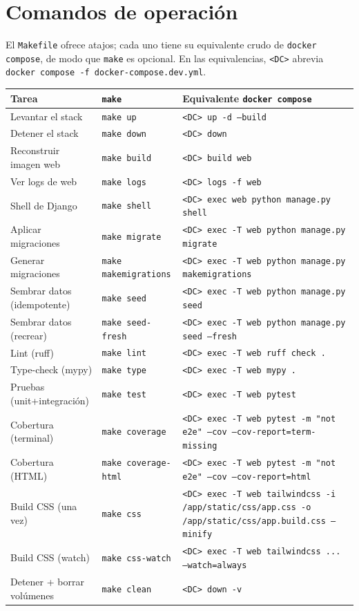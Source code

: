 \documentclass[12pt,letterpaper]{report}
\begin{document}
\chapter{Comandos de operación}

El \texttt{Makefile} ofrece atajos; cada uno tiene su equivalente crudo de
\texttt{docker compose}, de modo que \texttt{make} es opcional. En las
equivalencias, \texttt{<DC>} abrevia
\texttt{docker compose -f docker-compose.dev.yml}.

\begin{longtable}{L{3.6cm} L{2.7cm} L{7.2cm}}
\toprule
\textbf{Tarea} & \textbf{\texttt{make}} & \textbf{Equivalente \texttt{docker compose}} \\
\midrule
\endhead
Levantar el stack & \texttt{make up} & \texttt{<DC> up -d --build} \\
Detener el stack & \texttt{make down} & \texttt{<DC> down} \\
Reconstruir imagen web & \texttt{make build} & \texttt{<DC> build web} \\
Ver logs de web & \texttt{make logs} & \texttt{<DC> logs -f web} \\
Shell de Django & \texttt{make shell} & \texttt{<DC> exec web python manage.py shell} \\
Aplicar migraciones & \texttt{make migrate} & \texttt{<DC> exec -T web python manage.py migrate} \\
Generar migraciones & \texttt{make makemigrations} & \texttt{<DC> exec -T web python manage.py makemigrations} \\
Sembrar datos (idempotente) & \texttt{make seed} & \texttt{<DC> exec -T web python manage.py seed} \\
Sembrar datos (recrear) & \texttt{make seed-fresh} & \texttt{<DC> exec -T web python manage.py seed --fresh} \\
Lint (ruff) & \texttt{make lint} & \texttt{<DC> exec -T web ruff check .} \\
Type-check (mypy) & \texttt{make type} & \texttt{<DC> exec -T web mypy .} \\
Pruebas (unit+integración) & \texttt{make test} & \texttt{<DC> exec -T web pytest} \\
Cobertura (terminal) & \texttt{make coverage} & \texttt{<DC> exec -T web pytest -m "not e2e" --cov --cov-report=term-missing} \\
Cobertura (HTML) & \texttt{make coverage-html} & \texttt{<DC> exec -T web pytest -m "not e2e" --cov --cov-report=html} \\
Build CSS (una vez) & \texttt{make css} & \texttt{<DC> exec -T web tailwindcss -i /app/static/css/app.css -o /app/static/css/app.build.css --minify} \\
Build CSS (watch) & \texttt{make css-watch} & \texttt{<DC> exec -T web tailwindcss ... --watch=always} \\
Detener + borrar volúmenes & \texttt{make clean} & \texttt{<DC> down -v} \\
\bottomrule
\end{longtable}
\end{document}
